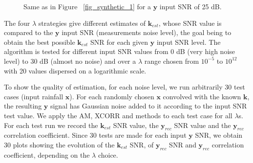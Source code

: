 \documentclass[]{elsarticle} %
\begin{document}
\begin{figure}[H]
    \centering
    \caption{Same as in Figure ~\ref{fig_synthetic_1} for a $\textbf{y}$ input SNR of 25 dB.}
    \label{fig_synthetic_2}
\end{figure}

The four $\lambda$ strategies give different estimates of $\textbf{k}_{est}$, whose SNR value is compared to the $\textbf{y}$ input SNR (measurements noise level), the goal being to obtain the best possible $\textbf{k}_{est}$ SNR for each given $\textbf{y}$ input SNR level. The algorithm is tested for different input SNR values from 0 dB (very high noise level) to 30 dB (almost no noise) and over a $\lambda$ range chosen from $10^{-5}$ to $10^{12}$  with 20 values dispersed on a logarithmic scale.

To show the quality of estimation, for each noise level, we run arbitrarily 30 test cases (input rainfall $\textbf{x}$). For each randomly chosen $\textbf{x}$ convolved with the known $\textbf{k}$, the resulting $\textbf{y}$ signal has Gaussian noise added to it according to the input SNR test value. 
We apply the AM, XCORR and \cite{Z_Hydro_Cirpka2007} methods to each test case for all $\lambda$s.
For each test run we record the $\textbf{k}_{est}$ SNR value, the $\textbf{y}_{rec}$ SNR value and the $\textbf{y}_{rec}$ correlation coefficient. Since 30 tests are made for each input $\textbf{y}$ SNR, we obtain 30 plots showing the evolution of the $\textbf{k}_{est}$ SNR, of $\textbf{y}_{rec}$ SNR and $\textbf{y}_{rec}$ correlation coefficient, depending on the $\lambda$ choice. 
\end{document}
